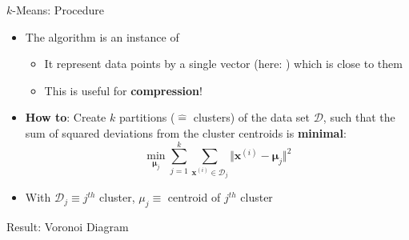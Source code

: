 \begin{frame}{$k$-Means: Procedure}{}\important
	\begin{itemize}
		\item The algorithm is an instance of 
		\begin{itemize}
			\item It represent data points by a single vector (here: ) which is close to them
			\item This is useful for \textbf{compression}!
		\end{itemize}
		\item \textbf{How to}: Create $k$ partitions ($\widehat{=}$ clusters) of the data set $\mathcal{D}$, such that
			the sum of squared deviations from the cluster centroids is \textbf{minimal}:
		\begin{equation}
			\min_{\bm{\mu}_j} \sum_{j=1}^k \sum_{\bm{x}^{(i)} \in \mathcal{D}_j} \Vert \bm{x}^{(i)} - \bm{\mu}_j \Vert^2
		\end{equation}
		\item With $\mathcal{D}_j \equiv j^{th}$ cluster, $\mu_j \equiv$ centroid of $j^{th}$ cluster
	\end{itemize}
\end{frame}


\begin{frame}{Result: Voronoi Diagram}{}\important
\end{frame}


